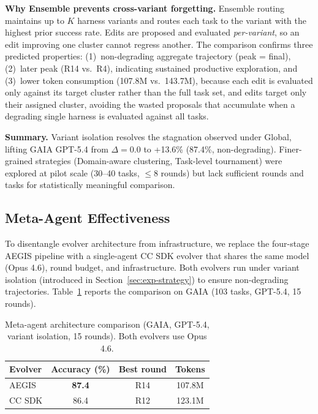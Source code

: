 \textbf{Why Ensemble prevents cross-variant forgetting.} Ensemble routing maintains up to $K$ harness variants and routes each task to the variant with the highest prior success rate. Edits are proposed and evaluated \textit{per-variant}, so an edit improving one cluster cannot regress another. The comparison confirms three predicted properties: (1)~non-degrading aggregate trajectory (peak = final), (2)~later peak (R14 vs.\ R4), indicating sustained productive exploration, and (3)~lower token consumption (107.8M vs.\ 143.7M), because each edit is evaluated only against its target cluster rather than the full task set, and edits target only their assigned cluster, avoiding the wasted proposals that accumulate when a degrading single harness is evaluated against all tasks.

\textbf{Summary.} Variant isolation resolves the stagnation observed under Global, lifting GAIA GPT-5.4 from $\Delta{=}0.0$ to +13.6\% (87.4\%, non-degrading). Finer-grained strategies (Domain-aware clustering, Task-level tournament) were explored at pilot scale (30--40 tasks, $\leq$8 rounds) but lack sufficient rounds and tasks for statistically meaningful comparison.


\subsection{Meta-Agent Effectiveness}
\label{sec:exp-meta-agent}

To disentangle evolver architecture from infrastructure, we replace the four-stage AEGIS pipeline with a single-agent CC SDK evolver that shares the same model (Opus 4.6), round budget, and infrastructure. Both evolvers run under variant isolation (introduced in Section~\ref{sec:exp-strategy}) to ensure non-degrading trajectories. Table~\ref{tab:meta-agent} reports the comparison on GAIA (103 tasks, GPT-5.4, 15 rounds).

\begin{table}[!htbp]
\centering
\small
\caption{Meta-agent architecture comparison (GAIA, GPT-5.4, variant isolation, 15 rounds). Both evolvers use Opus 4.6.}
\label{tab:meta-agent}
\begin{tabular}{lccc}
\toprule
\textbf{Evolver} & \textbf{Accuracy (\%)} & \textbf{Best round} & \textbf{Tokens} \\
\midrule
AEGIS   & \textbf{87.4} & R14 & 107.8M \\
CC SDK  & 86.4 & R12 & 123.1M \\
\bottomrule
\end{tabular}
\end{table}

